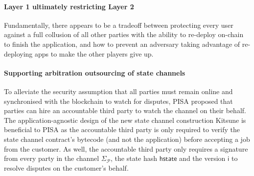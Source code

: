 \documentclass{llncs}
\newcommand{\hstate}{\mathsf{hstate}}
\newcommand{\monotoniccounter}{\mathsf{i}}
\newcommand{\participant}{\mathcal{P}}
\newcommand{\timerchallenge}{\mathsf{\Delta}_{\mathsf{challenge}}}
\newcommand{\timechallenge}{\mathsf{t}_{\mathsf{challenge}}}
\newcommand{\timerextra}{\mathsf{\Delta}_{\mathsf{extra}}}
\newcommand{\timerdispute}{\mathsf{\Delta}_{\mathsf{dispute}}}
\begin{document}

	
	
	
	\paragraph{Layer 1 ultimately restricting Layer 2} 
	Fundamentally, there appears to be a tradeoff between protecting every user against a full collusion of all other parties with the ability to re-deploy on-chain to finish the application, and how to prevent an adversary taking advantage of re-deploying apps to make the other players give up. 
	
	
	\paragraph{Supporting arbitration outsourcing of state channels} 
	To alleviate the security assumption that all parties must remain online and synchronised with the blockchain to watch for disputes, PISA \cite{mccorry2018pisa} proposed that parties can hire an accountable third party to watch the channel on their behalf. 
	The application-agnostic design of the new state channel construction \textsf{Kitsune} is beneficial to PISA as the accountable third party is only required to verify the state channel contract's bytecode (and not the application) before accepting a job from the customer. 
	As well,  the accountable third party only requires a signature from every party in the channel $\Sigma_{\participant}$, the state hash $\hstate$ and the version $\monotoniccounter$ to resolve disputes on the customer's behalf. 
	
\end{document}
